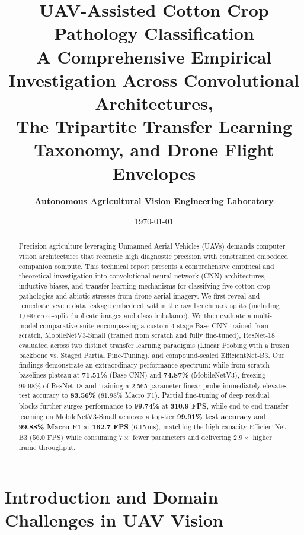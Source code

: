 \documentclass[11pt,a4paper]{article}
\title{\vspace{-1.5cm}\Huge\textbf{\color{ForestGreen}UAV-Assisted Cotton Crop Pathology Classification}\\[0.3em]
\Large\textbf{\color{Terracotta}A Comprehensive Empirical Investigation Across Convolutional Architectures,\\The Tripartite Transfer Learning Taxonomy, and Drone Flight Envelopes}}
\author{\textbf{Autonomous Agricultural Vision Engineering Laboratory}}
\date{\today}
\begin{document}
\maketitle

\begin{abstract}
\noindent
Precision agriculture leveraging Unmanned Aerial Vehicles (UAVs) demands computer vision architectures that reconcile high diagnostic precision with constrained embedded companion compute. This technical report presents a comprehensive empirical and theoretical investigation into convolutional neural network (CNN) architectures, inductive biases, and transfer learning mechanisms for classifying five cotton crop pathologies and abiotic stresses from drone aerial imagery. We first reveal and remediate severe data leakage embedded within the raw benchmark splits (including 1,040 cross-split duplicate images and class imbalance). We then evaluate a multi-model comparative suite encompassing a custom 4-stage Base CNN trained from scratch, MobileNetV3-Small (trained from scratch and fully fine-tuned), ResNet-18 evaluated across two distinct transfer learning paradigms (Linear Probing with a frozen backbone vs. Staged Partial Fine-Tuning), and compound-scaled EfficientNet-B3. Our findings demonstrate an extraordinary performance spectrum: while from-scratch baselines plateau at \textbf{71.51\%} (Base CNN) and \textbf{74.87\%} (MobileNetV3), freezing 99.98\% of ResNet-18 and training a 2,565-parameter linear probe immediately elevates test accuracy to \textbf{83.56\%} (81.98\% Macro F1). Partial fine-tuning of deep residual blocks further surges performance to \textbf{99.74\%} at \textbf{310.9 FPS}, while end-to-end transfer learning on MobileNetV3-Small achieves a top-tier \textbf{99.91\% test accuracy} and \textbf{99.88\% Macro F1} at \textbf{162.7 FPS} (6.15\,ms), matching the high-capacity EfficientNet-B3 (56.0 FPS) while consuming $7\times$ fewer parameters and delivering $2.9\times$ higher frame throughput.
\end{abstract}

\vspace{0.5cm}

\section{Introduction and Domain Challenges in UAV Vision}
\end{document}

